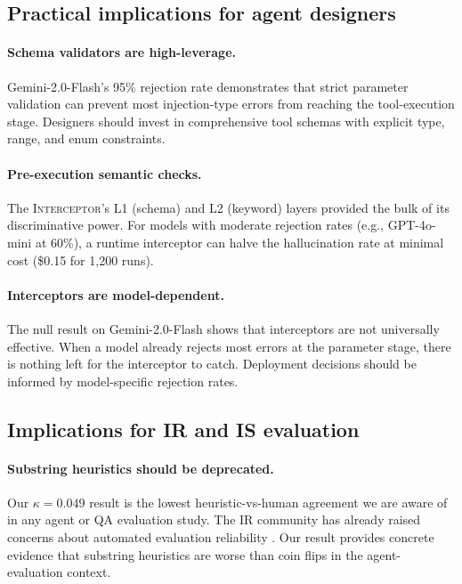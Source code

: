 \documentclass{article}
\newcommand{\interceptor}{\textsc{Interceptor}\xspace}
\begin{document}
\subsection{Practical implications for agent designers}

\paragraph{Schema validators are high-leverage.}
Gemini-2.0-Flash's 95\% rejection rate demonstrates that strict
parameter validation can prevent most injection-type errors from
reaching the tool-execution stage.
Designers should invest in comprehensive tool schemas with explicit
type, range, and enum constraints.

\paragraph{Pre-execution semantic checks.}
The \interceptor's L1 (schema) and L2 (keyword) layers provided the
bulk of its discriminative power.
For models with moderate rejection rates (e.g., GPT-4o-mini at 60\%),
a runtime interceptor can halve the hallucination rate at minimal cost
(\$0.15 for 1{,}200 runs).

\paragraph{Interceptors are model-dependent.}
The null result on Gemini-2.0-Flash shows that interceptors are not
universally effective.
When a model already rejects most errors at the parameter stage, there
is nothing left for the interceptor to catch.
Deployment decisions should be informed by model-specific rejection
rates.

\subsection{Implications for IR and IS evaluation}

\paragraph{Substring heuristics should be deprecated.}
Our $\kappa{=}0.049$ result is the lowest heuristic-vs-human agreement
we are aware of in any agent or QA evaluation study.
The IR community has already raised concerns about automated evaluation
reliability \citep{soboroff2024dont,thomas2024searcher}.
Our result provides concrete evidence that substring heuristics are
worse than coin flips in the agent-evaluation context.
\end{document}
